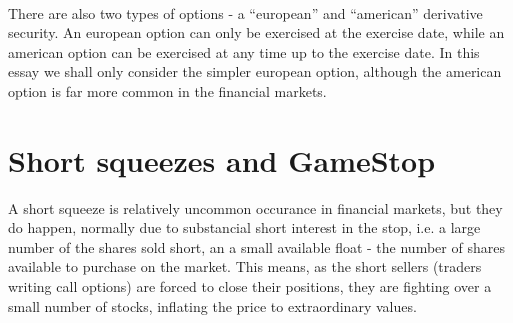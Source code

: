 \documentclass[11pt]{article} %
\begin{document}
\paragraph{}\label{typesofoption}
There are also two types of options - a ``european'' and ``american'' 
derivative security. An european option can only be exercised at the 
exercise date, while an american option can be exercised at any time up 
to the exercise date. In this essay we shall only consider the simpler 
european option, although the american option is far more common in 
the financial markets. 

\section{Short squeezes and GameStop}
A short squeeze is relatively uncommon occurance in financial markets, but they do 
happen, normally due to substancial short interest in the stop, i.e. a large number 
of the shares sold short, an a small available float - the number of shares 
available to purchase on the market. This means, as the short sellers (traders 
writing call options) are forced to close their positions, they are fighting over 
a small number of stocks, inflating the price to extraordinary values. 
\end{document}
